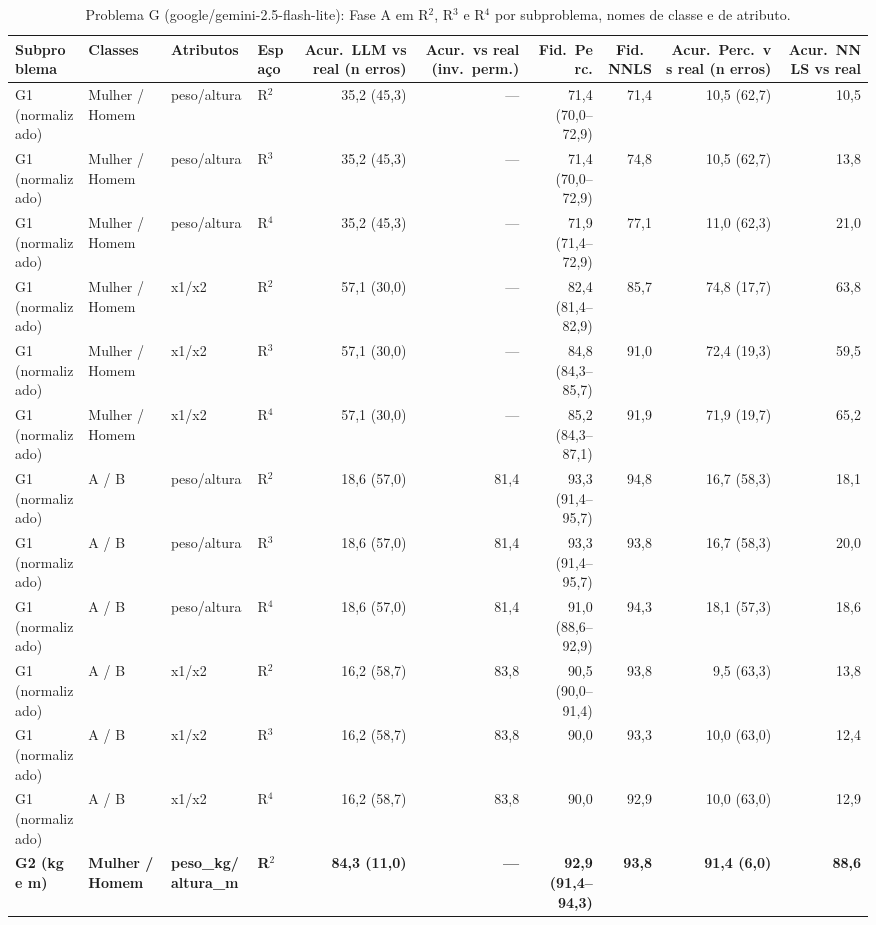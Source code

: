 \begin{table}[htbp]
\centering
\footnotesize
\caption{Problema G (google/gemini-2.5-flash-lite): Fase A em R$^2$, R$^3$ e R$^4$ por subproblema, nomes de classe e de atributo.}
\label{tab:bloco3_G_faseA_R2_R3_R4_flashlite}
\begin{tabular}{llllrrrrrr}
\toprule
Subproblema & Classes & Atributos & Espaço & Acur.\ LLM vs real (n erros) & Acur.\ vs real (inv.\ perm.) & Fid.\ Perc. & Fid.\ NNLS & Acur.\ Perc.\ vs real (n erros) & Acur.\ NNLS vs real \\
\midrule
G1 (normalizado) & Mulher / Homem & peso/altura & R$^2$ & 35,2 (45,3) & — & 71,4 (70,0–72,9) & 71,4 & 10,5 (62,7) & 10,5 \\
G1 (normalizado) & Mulher / Homem & peso/altura & R$^3$ & 35,2 (45,3) & — & 71,4 (70,0–72,9) & 74,8 & 10,5 (62,7) & 13,8 \\
G1 (normalizado) & Mulher / Homem & peso/altura & R$^4$ & 35,2 (45,3) & — & 71,9 (71,4–72,9) & 77,1 & 11,0 (62,3) & 21,0 \\
\midrule
G1 (normalizado) & Mulher / Homem & x1/x2 & R$^2$ & 57,1 (30,0) & — & 82,4 (81,4–82,9) & 85,7 & 74,8 (17,7) & 63,8 \\
G1 (normalizado) & Mulher / Homem & x1/x2 & R$^3$ & 57,1 (30,0) & — & 84,8 (84,3–85,7) & 91,0 & 72,4 (19,3) & 59,5 \\
G1 (normalizado) & Mulher / Homem & x1/x2 & R$^4$ & 57,1 (30,0) & — & 85,2 (84,3–87,1) & 91,9 & 71,9 (19,7) & 65,2 \\
\midrule
G1 (normalizado) & A / B & peso/altura & R$^2$ & 18,6 (57,0) & 81,4 & 93,3 (91,4–95,7) & 94,8 & 16,7 (58,3) & 18,1 \\
G1 (normalizado) & A / B & peso/altura & R$^3$ & 18,6 (57,0) & 81,4 & 93,3 (91,4–95,7) & 93,8 & 16,7 (58,3) & 20,0 \\
G1 (normalizado) & A / B & peso/altura & R$^4$ & 18,6 (57,0) & 81,4 & 91,0 (88,6–92,9) & 94,3 & 18,1 (57,3) & 18,6 \\
\midrule
G1 (normalizado) & A / B & x1/x2 & R$^2$ & 16,2 (58,7) & 83,8 & 90,5 (90,0–91,4) & 93,8 & 9,5 (63,3) & 13,8 \\
G1 (normalizado) & A / B & x1/x2 & R$^3$ & 16,2 (58,7) & 83,8 & 90,0 & 93,3 & 10,0 (63,0) & 12,4 \\
G1 (normalizado) & A / B & x1/x2 & R$^4$ & 16,2 (58,7) & 83,8 & 90,0 & 92,9 & 10,0 (63,0) & 12,9 \\
\midrule
\textbf{G2 (kg e m)} & \textbf{Mulher / Homem} & \textbf{peso\_kg/altura\_m} & \textbf{R$^2$} & \textbf{84,3 (11,0)} & \textbf{—} & \textbf{92,9 (91,4–94,3)} & \textbf{93,8} & \textbf{91,4 (6,0)} & \textbf{88,6} \\

\end{tabular}
\end{table}
